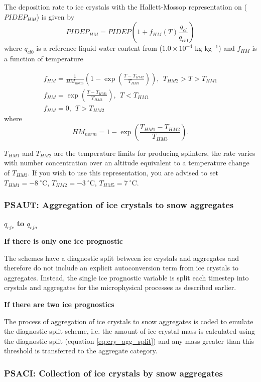 \documentclass{UMDP_article}
\def\bq{\begin{equation}}
\def\eq{\end{equation}}
\begin{document}
The deposition rate to ice crystals with the Hallett-Mossop representation
on ($PIDEP_{HM}$) is given by
\bq
PIDEP_{HM} = PIDEP \left( 1 + f_{HM}(T) \frac{q_{cl}}{q_{cl0}} \right)
\eq
where $q_{cl0}$ is a reference liquid water content from 
\citealp{Hallett:Mossop:1974}
($1.0 \times 10^{-4}$ kg kg$^{-1}$) and
$f_{HM}$ is a function of temperature

\begin{eqnarray}
f_{HM} = \frac{1}{HM_{norm}} \left( 1 - \exp \left( \frac{ T - T_{HM2} }{T_{HM3}} 
\right) \right),~~T_{HM2}>T>T_{HM1} \\
f_{HM} = \exp \left( \frac{ T - T_{HM1} }{T_{HM3}} \right), ~~T<T_{HM1} \\
f_{HM} = 0, ~~T>T_{HM2}
\end{eqnarray}
where
\bq
HM_{norm} = 1 - \exp \left( \frac{ T_{HM1} - T_{HM2} }{T_{HM3}} \right).
\eq

$T_{HM1}$ and $T_{HM2}$ are the temperature limits for producing splinters, 
the rate varies  with number concentration over an altitude 
equivalent to a temperature
change of $T_{HM3}$. If you wish to use this representation, you are advised to set
$T_{HM1} = -8~^{\circ}$C, $T_{HM2} = -3~^{\circ}$C, $T_{HM5} = 7~^{\circ}$C.

\subsubsection{PSAUT:  Aggregation of ice crystals to snow aggregates }

\textbf{$q_{cfc}$ to $q_{cfa}$}

\textbf{If there is only one ice prognostic}

The schemes have a diagnostic split between ice crystals and
aggregates and therefore do not include an explicit autoconversion term from
ice crystals to aggregates. Instead, the single ice prognostic variable is split
each timestep into crystals and aggregates for the microphysical 
processes as described earlier.

\textbf{If there are two ice prognostics} 

The process of aggregation of ice crystals to snow 
aggregates is coded to emulate the diagnostic split scheme, i.e. the amount
of ice crystal mass is calculated using the diagnostic split 
(equation \ref{eq:cry_agg_split}) and any mass greater than this threshold is 
transferred to the aggregate category.

\subsubsection{PSACI: Collection of ice crystals by snow aggregates}
\label{sec:PSACI}
\end{document}
